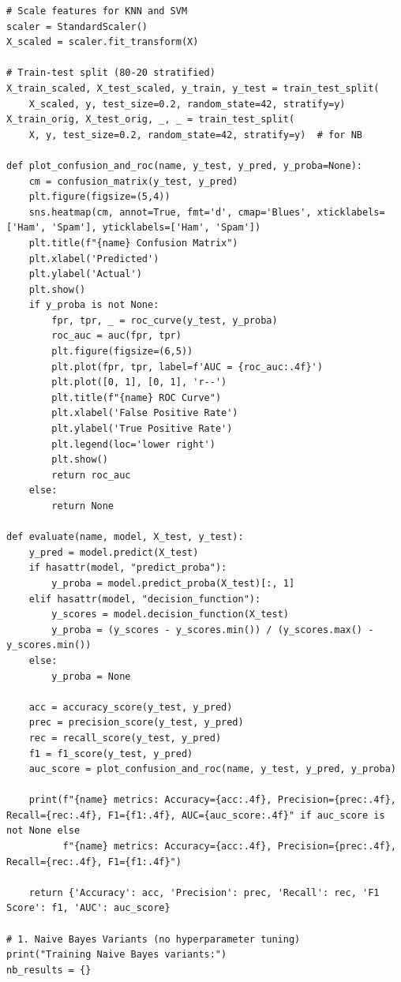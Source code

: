 \documentclass[12pt]{article}
\begin{document}
\begin{verbatim}
# Scale features for KNN and SVM
scaler = StandardScaler()
X_scaled = scaler.fit_transform(X)

# Train-test split (80-20 stratified)
X_train_scaled, X_test_scaled, y_train, y_test = train_test_split(
    X_scaled, y, test_size=0.2, random_state=42, stratify=y)
X_train_orig, X_test_orig, _, _ = train_test_split(
    X, y, test_size=0.2, random_state=42, stratify=y)  # for NB

def plot_confusion_and_roc(name, y_test, y_pred, y_proba=None):
    cm = confusion_matrix(y_test, y_pred)
    plt.figure(figsize=(5,4))
    sns.heatmap(cm, annot=True, fmt='d', cmap='Blues', xticklabels=['Ham', 'Spam'], yticklabels=['Ham', 'Spam'])
    plt.title(f"{name} Confusion Matrix")
    plt.xlabel('Predicted')
    plt.ylabel('Actual')
    plt.show()
    if y_proba is not None:
        fpr, tpr, _ = roc_curve(y_test, y_proba)
        roc_auc = auc(fpr, tpr)
        plt.figure(figsize=(6,5))
        plt.plot(fpr, tpr, label=f'AUC = {roc_auc:.4f}')
        plt.plot([0, 1], [0, 1], 'r--')
        plt.title(f"{name} ROC Curve")
        plt.xlabel('False Positive Rate')
        plt.ylabel('True Positive Rate')
        plt.legend(loc='lower right')
        plt.show()
        return roc_auc
    else:
        return None

def evaluate(name, model, X_test, y_test):
    y_pred = model.predict(X_test)
    if hasattr(model, "predict_proba"):
        y_proba = model.predict_proba(X_test)[:, 1]
    elif hasattr(model, "decision_function"):
        y_scores = model.decision_function(X_test)
        y_proba = (y_scores - y_scores.min()) / (y_scores.max() - y_scores.min())
    else:
        y_proba = None

    acc = accuracy_score(y_test, y_pred)
    prec = precision_score(y_test, y_pred)
    rec = recall_score(y_test, y_pred)
    f1 = f1_score(y_test, y_pred)
    auc_score = plot_confusion_and_roc(name, y_test, y_pred, y_proba)

    print(f"{name} metrics: Accuracy={acc:.4f}, Precision={prec:.4f}, Recall={rec:.4f}, F1={f1:.4f}, AUC={auc_score:.4f}" if auc_score is not None else
          f"{name} metrics: Accuracy={acc:.4f}, Precision={prec:.4f}, Recall={rec:.4f}, F1={f1:.4f}")

    return {'Accuracy': acc, 'Precision': prec, 'Recall': rec, 'F1 Score': f1, 'AUC': auc_score}

# 1. Naive Bayes Variants (no hyperparameter tuning)
print("Training Naive Bayes variants:")
nb_results = {}


\end{verbatim}
\end{document}
